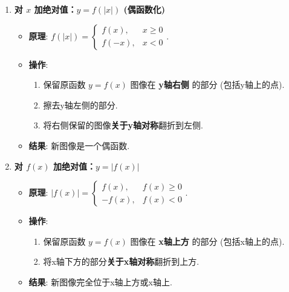 \begin{theorem}[翻折变换法则]
	\begin{enumerate}
		\item \textbf{对 $x$ 加绝对值：$y=f(|x|)$ (偶函数化)}
		\begin{itemize}
			\item \textbf{原理}: $f(|x|) = \begin{cases} f(x), & x \ge 0 \\ f(-x), & x < 0 \end{cases}$.
			\item \textbf{操作}:
			\begin{enumerate}
				\item 保留原函数 $y=f(x)$ 图像在 \textbf{y轴右侧} 的部分 (包括y轴上的点).
				\item 擦去y轴左侧的部分.
				\item 将右侧保留的图像\textbf{关于y轴对称}翻折到左侧.
			\end{enumerate}
			\item \textbf{结果}: 新图像是一个偶函数.
		\end{itemize}
		
		\item \textbf{对 $f(x)$ 加绝对值：$y=|f(x)|$}
		\begin{itemize}
			\item \textbf{原理}: $|f(x)| = \begin{cases} f(x), & f(x) \ge 0 \\ -f(x), & f(x) < 0 \end{cases}$.
			\item \textbf{操作}:
			\begin{enumerate}
				\item 保留原函数 $y=f(x)$ 图像在 \textbf{x轴上方} 的部分 (包括x轴上的点).
				\item 将x轴下方的部分\textbf{关于x轴对称}翻折到上方.
			\end{enumerate}
			\item \textbf{结果}: 新图像完全位于x轴上方或x轴上.
		\end{itemize}
	\end{enumerate}
\end{theorem}

